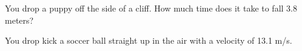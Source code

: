 \documentclass[10pt]{exam}
\begin{document}
\begin{questions}
\question  
  You drop a puppy off the side of a cliff.  How much time does it take to fall 3.8 meters?
  \vs

\question  
  You drop kick a soccer ball straight up in the air with a velocity of 13.1 m/s.  
  


\end{questions}
\end{document}
